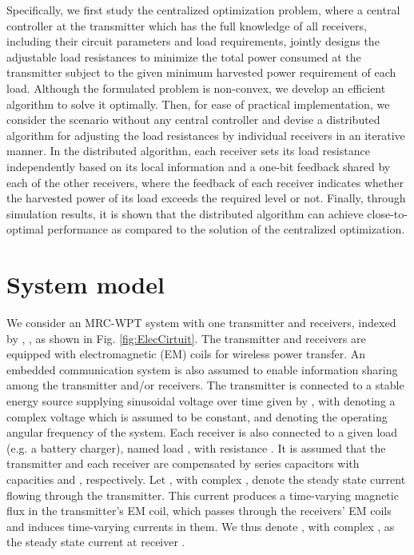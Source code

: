 \documentclass[onecolumn, a4size, 11pt]{IEEEtran}
\begin{document}
Specifically, we  first study the centralized optimization problem, where  a central controller at the transmitter which has the full knowledge of all receivers, including their circuit parameters and load requirements, jointly designs the adjustable load resistances   to minimize  the total power consumed at the transmitter subject to the given  minimum harvested power requirement of each load.  
Although the formulated problem is  non-convex, we  develop an efficient algorithm to solve  it optimally. 
Then, for ease of practical implementation, we consider the scenario without any central controller and devise a distributed algorithm for  adjusting the  load  resistances by individual receivers in an iterative manner.  
In the distributed algorithm, each receiver  sets its load  resistance independently based on its local information and a  one-bit feedback shared by each of the other receivers, where the feedback of each receiver indicates whether the harvested power   of its load  exceeds the required level or not.  
Finally, through simulation results,  it is shown that   the distributed algorithm can achieve close-to-optimal performance as compared to the solution of the 
centralized optimization.  
\section{System model} \label{sec:intro} 
We consider an  MRC-WPT system with  one transmitter and  receivers, indexed by , ,  as shown in Fig. \ref{fig:ElecCirtuit}.  The transmitter and receivers are equipped with  electromagnetic (EM) coils for wireless power transfer.  
An embedded   communication system is  also assumed to enable information sharing among the transmitter and/or  receivers. 
The transmitter is connected  to a stable energy source supplying sinusoidal  voltage  over time given by  ,  with    denoting a complex voltage which is assumed to be constant,   and  denoting the operating angular frequency of the system.  
Each receiver  is also connected to a given load (e.g. a battery charger),  named   load ,  with resistance  . 
It is  assumed  that the transmitter and each receiver  are compensated  by series capacitors with capacities   and , respectively. 
Let ,  with complex  , denote the steady state current  flowing through the transmitter. 
This current produces a time-varying magnetic flux in the transmitter's EM  coil, which passes through the receivers' EM  coils and  induces time-varying currents in them. 
We  thus denote  ,  with complex , as the steady state current at receiver .
\end{document}
